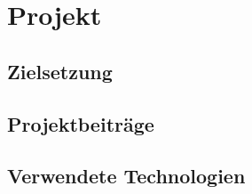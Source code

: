\chapter{Projekt}

\section{Zielsetzung}


\section{Projektbeiträge}


\section{Verwendete Technologien}

